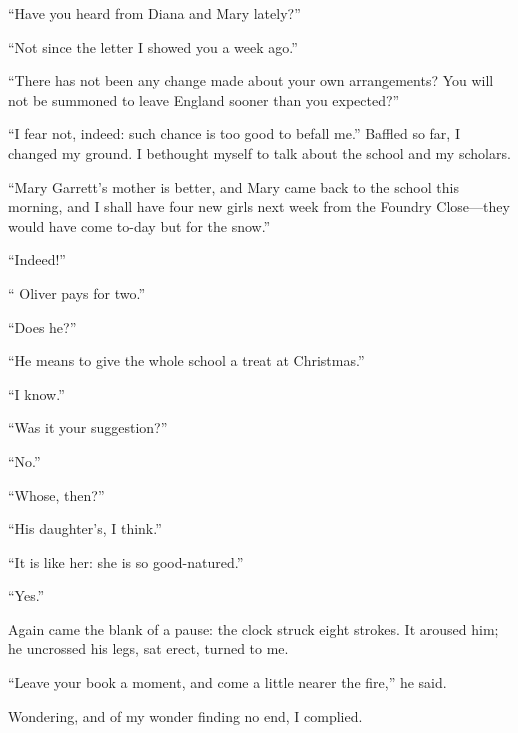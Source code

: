 \enquote{Have you heard from Diana and Mary lately?}

\enquote{Not since the letter I showed you a week ago.}

\enquote{There has not been any change made about your own
arrangements? You will not be summoned to leave England sooner than you
expected?}

\enquote{I fear not, indeed: such chance is too good to befall me.} 
Baffled so far, I changed my ground. I bethought myself to talk about
the school and my scholars.

\enquote{Mary Garrett's mother is better, and Mary came back to the
school this morning, and I shall have four new girls next week from the
Foundry Close---they would have come to-day but for the snow.}

\enquote{Indeed!}

\enquote{\Mr{} Oliver pays for two.}

\enquote{Does he?}

\enquote{He means to give the whole school a treat at Christmas.}

\enquote{I know.}

\enquote{Was it your suggestion?}

\enquote{No.}

\enquote{Whose, then?}

\enquote{His daughter's, I think.}

\enquote{It is like her: she is so good-natured.}

\enquote{Yes.}

Again came the blank of a pause: the clock struck eight strokes. It
aroused him; he uncrossed his legs, sat erect, turned to me.

\enquote{Leave your book a moment, and come a little nearer the fire,}
he said.

Wondering, and of my wonder finding no end, I complied.

